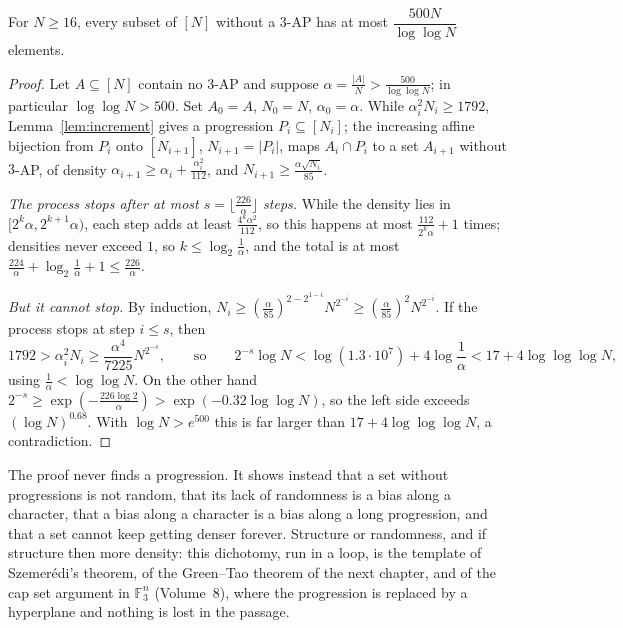 \begin{theorem}[Roth, 1953]\label{thm:roth}
For $N\ge16$, every subset of $[N]$ without a $3$-AP has at most $\dfrac{500N}{\log\log N}$ elements.
\end{theorem}
\begin{proof}
Let $A\subseteq[N]$ contain no $3$-AP and suppose $\alpha=\frac{|A|}N>\frac{500}{\log\log N}$; in particular $\log\log N>500$. Set $A_0=A$, $N_0=N$, $\alpha_0=\alpha$. While $\alpha_i^2N_i\ge1792$, Lemma~\ref{lem:increment} gives a progression $P_i\subseteq[N_i]$; the increasing affine bijection from $P_i$ onto $[N_{i+1}]$, $N_{i+1}=|P_i|$, maps $A_i\cap P_i$ to a set $A_{i+1}$ without $3$-AP, of density $\alpha_{i+1}\ge\alpha_i+\frac{\alpha_i^2}{112}$, and $N_{i+1}\ge\frac{\alpha\sqrt{N_i}}{85}$.

\emph{The process stops after at most $s=\lfloor\frac{226}\alpha\rfloor$ steps.} While the density lies in $[2^k\alpha,2^{k+1}\alpha)$, each step adds at least $\frac{4^k\alpha^2}{112}$, so this happens at most $\frac{112}{2^k\alpha}+1$ times; densities never exceed $1$, so $k\le\log_2\frac1\alpha$, and the total is at most $\frac{224}\alpha+\log_2\frac1\alpha+1\le\frac{226}\alpha$.

\emph{But it cannot stop.} By induction, $N_i\ge(\frac\alpha{85})^{2-2^{1-i}}N^{2^{-i}}\ge(\frac\alpha{85})^2N^{2^{-i}}$. If the process stops at step $i\le s$, then
\[
1792>\alpha_i^2N_i\ge\frac{\alpha^4}{7225}N^{2^{-s}},\qquad\text{so}\qquad2^{-s}\log N<\log(1.3\cdot10^7)+4\log\frac1\alpha<17+4\log\log\log N,
\]
using $\frac1\alpha<\log\log N$. On the other hand $2^{-s}\ge\exp(-\frac{226\log2}\alpha)>\exp(-0.32\log\log N)$, so the left side exceeds $(\log N)^{0.68}$. With $\log N>e^{500}$ this is far larger than $17+4\log\log\log N$, a contradiction.
\end{proof}

\begin{beauty}
The proof never finds a progression. It shows instead that a set without progressions is not random, that its lack of randomness is a bias along a character, that a bias along a character is a bias along a long progression, and that a set cannot keep getting denser forever. Structure or randomness, and if structure then more density: this dichotomy, run in a loop, is the template of Szemerédi's theorem, of the Green--Tao theorem of the next chapter, and of the cap set argument in $\mathbb F_3^n$ (Volume~8), where the progression is replaced by a hyperplane and nothing is lost in the passage.
\end{beauty}

